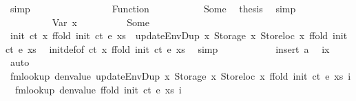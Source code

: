 \begin{isabellebody}
\ simp\isanewline
\ \ \ \ \ \ \isamarkupfalse%
\isanewline
\ \ \ \ \ \ \ \ \isamarkupfalse%
\ {\isacharparenleft}{\kern0pt}Function\ {\isacharunderscore}{\kern0pt}{\isacharparenright}{\kern0pt}\isanewline
\ \ \ \ \ \ \ \ \isamarkupfalse%
\ Some\ \isamarkupfalse%
\ {\isacharquery}{\kern0pt}thesis\ \isamarkupfalse%
\ simp\isanewline
\ \ \ \ \ \ \isamarkupfalse%
\isanewline
\ \ \ \ \ \ \ \ \isamarkupfalse%
\ {\isacharparenleft}{\kern0pt}Var\ x{}{\isacharparenright}{\kern0pt}\isanewline
\ \ \ \ \ \ \ \ \isamarkupfalse%
\ Some\ \isamarkupfalse%
\ {\isachardoublequoteopen}init\ ct\ x\ {\isacharparenleft}{\kern0pt}ffold\ {\isacharparenleft}{\kern0pt}init\ ct{\isacharparenright}{\kern0pt}\ e\ xs{\isacharparenright}{\kern0pt}\ {\isacharequal}{\kern0pt}\ updateEnvDup\ x\ {\isacharparenleft}{\kern0pt}Storage\ x{}{\isacharparenright}{\kern0pt}\ {\isacharparenleft}{\kern0pt}Storeloc\ x{\isacharparenright}{\kern0pt}\ {\isacharparenleft}{\kern0pt}ffold\ {\isacharparenleft}{\kern0pt}init\ ct{\isacharparenright}{\kern0pt}\ e\ xs{\isacharparenright}{\kern0pt}{\isachardoublequoteclose}\ \isamarkupfalse%
\ init{\isacharunderscore}{\kern0pt}def{\isacharbrackleft}{\kern0pt}of\ ct\ x\ {\isachardoublequoteopen}{\isacharparenleft}{\kern0pt}ffold\ {\isacharparenleft}{\kern0pt}init\ ct{\isacharparenright}{\kern0pt}\ e\ xs{\isacharparenright}{\kern0pt}{\isachardoublequoteclose}{\isacharbrackright}{\kern0pt}\ \isamarkupfalse%
\ simp\isanewline
\ \ \ \ \ \ \ \ \isamarkupfalse%
\ \isamarkupfalse%
\ insert\ a\ \isamarkupfalse%
\ {\isachardoublequoteopen}i{\isasymnoteq}x{\isachardoublequoteclose}\ \isamarkupfalse%
\ auto\isanewline
\ \ \ \ \ \ \ \ \isamarkupfalse%
\ \isamarkupfalse%
\ {\isachardoublequoteopen}fmlookup\ {\isacharparenleft}{\kern0pt}denvalue\ {\isacharparenleft}{\kern0pt}updateEnvDup\ x\ {\isacharparenleft}{\kern0pt}Storage\ x{}{\isacharparenright}{\kern0pt}\ {\isacharparenleft}{\kern0pt}Storeloc\ x{\isacharparenright}{\kern0pt}\ {\isacharparenleft}{\kern0pt}ffold\ {\isacharparenleft}{\kern0pt}init\ ct{\isacharparenright}{\kern0pt}\ e\ xs{\isacharparenright}{\kern0pt}{\isacharparenright}{\kern0pt}{\isacharparenright}{\kern0pt}\ i\ {\isacharequal}{\kern0pt}\ fmlookup\ {\isacharparenleft}{\kern0pt}denvalue\ {\isacharparenleft}{\kern0pt}ffold\ {\isacharparenleft}{\kern0pt}init\ ct{\isacharparenright}{\kern0pt}\ e\ xs{\isacharparenright}{\kern0pt}{\isacharparenright}{\kern0pt}\ i{\isachardoublequoteclose}\ \isamarkupfalse%

\end{isabellebody}
